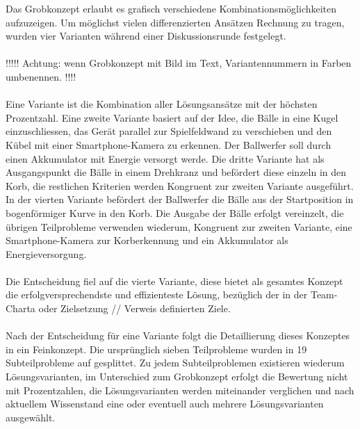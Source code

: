 Das Grobkonzept erlaubt es grafisch verschiedene Kombinationsmöglichkeiten aufzuzeigen. Um möglichst vielen differenzierten Ansätzen Rechnung zu tragen, wurden vier Varianten während einer Diskussionsrunde festgelegt.\\\\
!!!!! Achtung: wenn Grobkonzept mit Bild im Text, Variantennummern in Farben umbenennen. !!!!\\\\
Eine Variante ist die Kombination aller Lösungsansätze mit der höchsten Prozentzahl. Eine zweite Variante basiert auf der Idee, die Bälle in eine Kugel einzuschliessen, das Gerät parallel zur Spielfeldwand zu verschieben und den Kübel mit einer Smartphone-Kamera zu erkennen. Der Ballwerfer soll durch einen Akkumulator mit Energie versorgt werde. Die dritte Variante hat als Ausgangspunkt die Bälle in einem Drehkranz und befördert diese einzeln in den Korb, die restlichen Kriterien werden Kongruent zur zweiten Variante ausgeführt. In der vierten Variante befördert der Ballwerfer die Bälle aus der Startposition in bogenförmiger Kurve in den Korb. Die Ausgabe der Bälle erfolgt vereinzelt, die übrigen Teilprobleme verwenden wiederum, Kongruent zur zweiten Variante, eine Smartphone-Kamera zur Korberkennung und ein Akkumulator als Energieversorgung.\\
\\
Die Entscheidung fiel auf die vierte Variante, diese bietet als gesamtes Konzept die erfolgversprechendste und effizienteste Lösung, bezüglich der in der 
Team-Charta oder Zielsetzung // Verweis definierten Ziele.\\
\\
Nach der Entscheidung für eine Variante folgt die Detaillierung dieses Konzeptes
in ein Feinkonzept. Die ursprünglich sieben Teilprobleme wurden in 19 Subteilprobleme
auf gesplittet. Zu jedem Subteilproblemen existieren wiederum Lösungsvarianten, im Unterschied zum Grobkonzept erfolgt die Bewertung nicht mit Prozentzahlen, die Lösungsvarianten werden miteinander verglichen und nach aktuellem Wissenstand eine oder eventuell auch mehrere Lösungsvarianten ausgewählt. 


